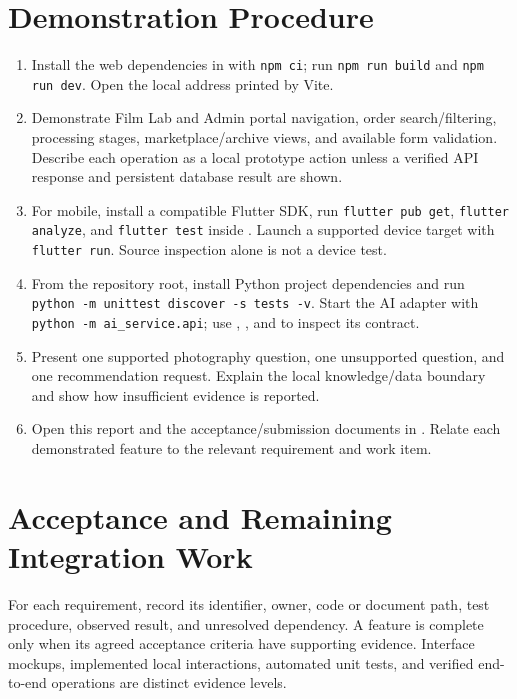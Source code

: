 \section{Demonstration Procedure}
\begin{enumerate}
\item Install the web dependencies in  with
\texttt{npm ci}; run \texttt{npm run build} and \texttt{npm run dev}.
Open the local address printed by Vite.
\item Demonstrate Film Lab and Admin portal navigation, order search/filtering,
processing stages, marketplace/archive views, and available form validation.
Describe each operation as a local prototype action unless a verified API
response and persistent database result are shown.
\item For mobile, install a compatible Flutter SDK, run
\texttt{flutter pub get}, \texttt{flutter analyze}, and \texttt{flutter test}
inside . Launch a supported device target with
\texttt{flutter run}. Source inspection alone is not a device test.
\item From the repository root, install Python project dependencies and run
\texttt{python -m unittest discover -s tests -v}. Start the AI adapter with
\texttt{python -m ai\_service.api}; use , , and
 to inspect its contract.
\item Present one supported photography question, one unsupported question,
and one recommendation request. Explain the local knowledge/data boundary and
show how insufficient evidence is reported.
\item Open this report and the acceptance/submission documents in .
Relate each demonstrated feature to the relevant requirement and work item.
\end{enumerate}

\section{Acceptance and Remaining Integration Work}
For each requirement, record its identifier, owner, code or document path,
test procedure, observed result, and unresolved dependency. A feature is
complete only when its agreed acceptance criteria have supporting evidence.
Interface mockups, implemented local interactions, automated unit tests, and
verified end-to-end operations are distinct evidence levels.

